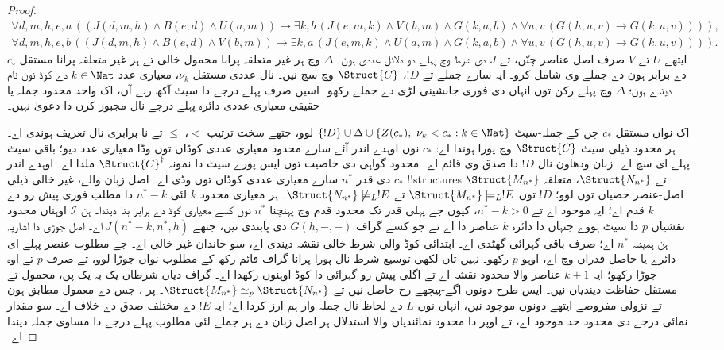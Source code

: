 \documentclass[../../../include/open-logic-section]{subfiles}
\begin{document}
\begin{proof}
\[\begin{gathered}
\forall d,m,h,e,a\,((J(d,m,h)\land B(e,d)\land U(a,m))\to
\exists k,b\,(J(e,m,k)\land V(b,m)\land G(k,a,b)\land
\forall u,v\,(G(h,u,v)\to G(k,u,v)))),\\
\forall d,m,h,e,b\,((J(d,m,h)\land B(e,d)\land V(b,m))\to
\exists k,a\,(J(e,m,k)\land U(a,m)\land G(k,a,b)\land
\forall u,v\,(G(h,u,v)\to G(k,u,v)))).
\end{gathered}
\]
ایتھے $U$ تے $V$ صرف اصل عناصر چنّن، تے $J$ دی شرط وچ
پہلے دو دلائل عددی ہون۔ $\Delta$ وچ ہر غیر متعلقہ پرانا محمول خالی تے ہر
غیر متعلقہ پرانا مستقل $c_\circ$ دے برابر ہون دے جملے وی
شامل کرو۔ ایہ سارے جملے تے $!D$، $\Struct{C}$ وچ سچ
نیں۔ نال عددی مستقل $\nu_k$، معیاری عدد $k\in\Nat$ دے
کوڈ نوں نام دیندے ہون؛ $\Delta$ وچ پہلے رکن توں انہاں دی
فوری جانشینی لڑی دے جملے رکھو۔ اسیں صرف پہلے درجے دا سیٹ
آکھ رہے آں، اک واحد محدود جملہ یا حقیقی معیاری عددی دائرہ
پہلے درجے نال مجبور کرن دا دعویٰ نہیں۔

اک نواں مستقل $c_*$ چن کے جملہ-سیٹ
$\{!D\}\cup\Delta\cup\{Z(c_*),\ \nu_k<c_*:k\in\Nat\}$
لوو، جتھے سخت ترتیب $<$، $\le$ تے نا برابری نال تعریف
ہوندی اے۔ ہر محدود ذیلی سیٹ $\Struct{C}$ وچ پورا ہوندا
اے: $c_*$ نوں اوہدے اندر آئے سارے محدود معیاری عددی کوڈاں
توں وڈا معیاری عدد دیو؛ باقی سیٹ پہلے ای سچ اے۔ زبان ودھاون
نال $!D$ دا صدق وی قائم اے۔ محدود گواہی دی خاصیت توں
ایس پورے سیٹ دا نمونہ $\Struct{C}^{\dagger}$ ملدا اے۔
اوہدے اندر $c_*$ دی قدر $n^*$ سارے معیاری عددی کوڈاں توں
وڈی اے۔ اصل زبان والے، غیر خالی ذیلی !!{structure}s
$\Struct{M_{n^*}}$ تے $\Struct{N_{n^*}}$، متعلقہ
اصل-عنصر حصیاں توں لوو؛ $!D$ توں
$\Struct{M_{n^*}}\models_L !E$ تے
$\Struct{N_{n^*}}\not\models_L !E$۔ ہر معیاری محدود
$k$ لئی $n^*-k$ دا مطلب فوری پیش رو دے $k$ قدم اے؛
ایہ موجود اے تے $n^*-k>0$، کیوں جے پہلی قدر تک محدود
قدم وچ پہنچنا $n^*$ نوں کسے معیاری کوڈ دے برابر بنا دیندا۔
ہن $\mathcal{I}$ اوہناں محدود نقشیاں $p$ دا سیٹ ہووے جنہاں
دا دائرہ $k$ عناصر دا اے تے جو کسے گراف $G(h,-,-)$ دی
پابندی نیں، جتھے $J(n^*-k,n^*,h)$ اے۔ اصل جوڑی دا
اشاریہ ہن ہمیشہ $n^*$ اے؛ صرف باقی گہرائی گھٹدی اے۔
ابتدائی کوڈ والی شرط خالی نقشہ دیندی اے، سو خاندان غیر خالی
اے۔ جے مطلوب عنصر پہلے ای دائرے یا حاصل قدراں وچ اے، اوہو
$p$ رکھو۔ نہیں تاں لکھی توسیع شرط نال پورا پرانا گراف قائم
رکھ کے مطلوب نواں جوڑا لوو، تے صرف $p$ تے اوہ جوڑا رکھو؛
ایہ $k+1$ عناصر والا محدود نقشہ اے تے اگلی پیش رو گہرائی
دا کوڈ اوہنوں رکھدا اے۔ گراف دیاں شرطاں یک بہ یک پن، محمول تے
مستقل حفاظت دیندیاں نیں۔ ایس طرح دونوں اگے-پیچھے رخ حاصل
نیں تے $\Struct{M_{n^*}}\simeq_p\Struct{N_{n^*}}$۔
پر ، جس دے معمول مطابق ہون تے
نزولی مفروضے ایتھے دونوں موجود نیں، انہاں نوں $L$ دے لحاظ
نال جملہ وار ہم ارز کردا اے؛ ایہ $!E$ دے مختلف صدق دے
خلاف اے۔ سو مقدار نمائی درجے دی محدود حد موجود اے، تے اوپر دا محدود
نمائندیاں والا استدلال ہر اصل زبان دے ہر جملے لئی مطلوب
پہلے درجے دا مساوی جملہ دیندا اے۔
\end{proof}
\end{document}
